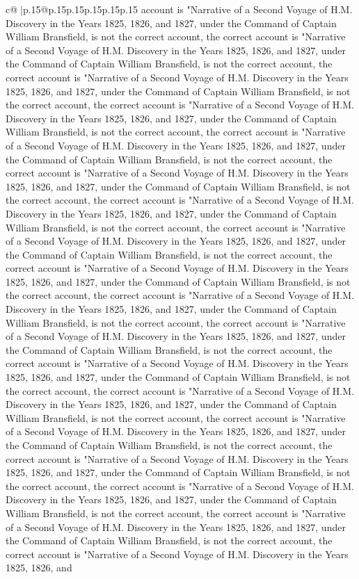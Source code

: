 \documentclass{article}
\begin{document}
{\begin{supertabular}{c@{$\;$}|p{.15\linewidth}@{}p{.15\linewidth}p{.15\linewidth}p{.15\linewidth}p{.15\linewidth}p{.15\linewidth}}
{{{account is "Narrative of a Second Voyage of H.M. Discovery in the Years 1825, 1826, and 1827, under the Command of Captain William Bransfield, is not the correct account, the correct account is "Narrative of a Second Voyage of H.M. Discovery in the Years 1825, 1826, and 1827, under the Command of Captain William Bransfield, is not the correct account, the correct account is "Narrative of a Second Voyage of H.M. Discovery in the Years 1825, 1826, and 1827, under the Command of Captain William Bransfield, is not the correct account, the correct account is "Narrative of a Second Voyage of H.M. Discovery in the Years 1825, 1826, and 1827, under the Command of Captain William Bransfield, is not the correct account, the correct account is "Narrative of a Second Voyage of H.M. Discovery in the Years 1825, 1826, and 1827, under the Command of Captain William Bransfield, is not the correct account, the correct account is "Narrative of a Second Voyage of H.M. Discovery in the Years 1825, 1826, and 1827, under the Command of Captain William Bransfield, is not the correct account, the correct account is "Narrative of a Second Voyage of H.M. Discovery in the Years 1825, 1826, and 1827, under the Command of Captain William Bransfield, is not the correct account, the correct account is "Narrative of a Second Voyage of H.M. Discovery in the Years 1825, 1826, and 1827, under the Command of Captain William Bransfield, is not the correct account, the correct account is "Narrative of a Second Voyage of H.M. Discovery in the Years 1825, 1826, and 1827, under the Command of Captain William Bransfield, is not the correct account, the correct account is "Narrative of a Second Voyage of H.M. Discovery in the Years 1825, 1826, and 1827, under the Command of Captain William Bransfield, is not the correct account, the correct account is "Narrative of a Second Voyage of H.M. Discovery in the Years 1825, 1826, and 1827, under the Command of Captain William Bransfield, is not the correct account, the correct account is "Narrative of a Second Voyage of H.M. Discovery in the Years 1825, 1826, and 1827, under the Command of Captain William Bransfield, is not the correct account, the correct account is "Narrative of a Second Voyage of H.M. Discovery in the Years 1825, 1826, and 1827, under the Command of Captain William Bransfield, is not the correct account, the correct account is "Narrative of a Second Voyage of H.M. Discovery in the Years 1825, 1826, and 1827, under the Command of Captain William Bransfield, is not the correct account, the correct account is "Narrative of a Second Voyage of H.M. Discovery in the Years 1825, 1826, and 1827, under the Command of Captain William Bransfield, is not the correct account, the correct account is "Narrative of a Second Voyage of H.M. Discovery in the Years 1825, 1826, and 1827, under the Command of Captain William Bransfield, is not the correct account, the correct account is "Narrative of a Second Voyage of H.M. Discovery in the Years 1825, 1826, and 1827, under the Command of Captain William Bransfield, is not the correct account, the correct account is "Narrative of a Second Voyage of H.M. Discovery in the Years 1825, 1826, and }}}
\end{supertabular}}
\end{document}
